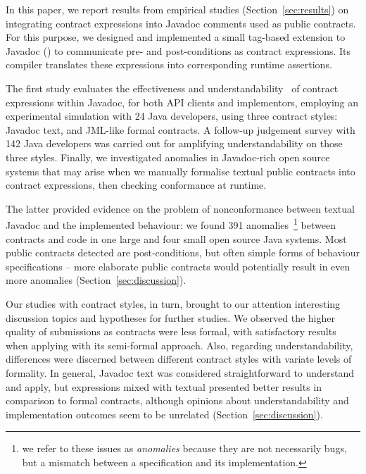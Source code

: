 In this paper, we report results from empirical studies (Section~\ref{sec:results}) on integrating contract expressions into Javadoc comments used as public contracts. 
For this purpose, we designed and implemented a small tag-based extension to Javadoc (\contractjdoc{}) to communicate pre- and post-conditions as contract expressions.
Its compiler translates these expressions into corresponding runtime assertions.

The first study evaluates the effectiveness and understandability~\cite{Scalabrino2017} of contract expressions within Javadoc, for both API clients and implementors, employing an experimental simulation with 24 Java developers, using three contract styles: Javadoc text, \contractjdoc{} and JML-like formal contracts. 
A follow-up judgement survey with 142 Java developers was carried out for amplifying understandability on those three styles.
Finally, we investigated anomalies in Javadoc-rich open source systems that may arise when we manually formalise textual public contracts into contract expressions, then checking conformance at runtime.

The latter provided evidence on the problem of nonconformance between textual Javadoc and the implemented behaviour: we found 391 anomalies~\footnote{we refer to these issues as \emph{anomalies} because they are not necessarily bugs, but a mismatch between a specification and its implementation.} between contracts and code in one large and four small open source Java systems. Most public contracts detected are post-conditions, but often simple forms of behaviour specifications -- more elaborate public contracts would potentially result in even more anomalies (Section~\ref{sec:discussion}).

Our studies with contract styles, in turn, brought to our attention interesting discussion topics and hypotheses for further studies. 
We observed the higher quality of submissions as contracts were less formal, with satisfactory results when applying \contractjdoc{} with its semi-formal approach. Also, regarding understandability, differences were discerned between different contract styles with variate levels of formality.
In general, Javadoc text was considered straightforward to understand and apply, but \contractjdoc{} expressions mixed with textual presented better results in comparison to formal contracts, although opinions about understandability and implementation outcomes seem to be unrelated (Section~\ref{sec:discussion}).

